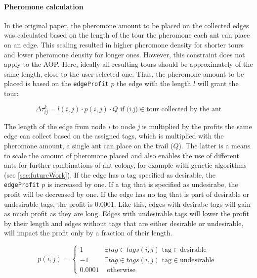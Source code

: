 \paragraph{Pheromone calculation}

In the original paper, the pheromone amount to be placed on the collected edges was calculated based on the length of the tour the pheromone each ant can place on an edge. 
This scaling resulted in higher pheromone density for shorter tours and lower pheromone density for longer ones.
However, this constraint does not apply to the AOP.
Here, ideally all resulting tours should be approximately of the same length, close to the user-selected one.
Thus, the pheromone amount to be placed is based on the \texttt{edgeProfit} $p$ the edge with the length $l$ will grant the tour:


\begin{equation}
	\label{eq:newPheromoneCalc}
	\Delta\tau_{ij}^k = l(i,j) \cdot p(i,j) \cdot Q \text{ if (i,j)} \in \text{tour collected by the ant}
\end{equation}

The length of the edge from node \textit{i} to node \textit{j} is multiplied by the profits the same edge can collect based on the assigned tags, which is multiplied with the pheromone amount, a single ant can place on the trail ($Q$).
The latter is a means to scale the amount of pheromone placed and also enables the use of different ants for further combinations of ant colony, for example with genetic algorithms (see \ref{sec:futureWork}).
If the edge has a tag specified as desirable, the \texttt{edgeProfit} $p$ is increased by one.
If a tag that is specified as undesirabe, the profit will be decreased by one.
If the edge has no tag that is part of desirable or undesirable tags, the profit is 0.0001.
Like this, edges with desirabe tags will gain as much profit as they are long. 
Edges with undesirable tags will lower the profit by their length and edges without tags that are either desirable or undesirable, will impact the profit only by a fraction of their length.

\begin{equation}
	\label{eq:newProfitCalc}
	p(i,j) = \begin{cases}
		1 &\exists tag \in tags(i,j) \text{ tag} \in \text{desirable }\\
		-1 &\exists tag \in tags(i,j) \text{ tag} \in \text{undesirable }\\
		0.0001 &\text{ otherwise}
	\end{cases}
\end{equation}

